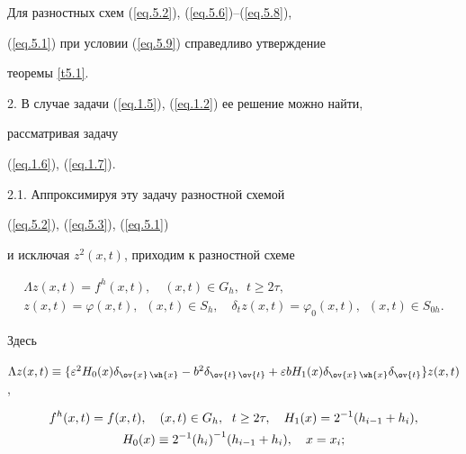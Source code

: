 Для разностных схем (\ref{eq.5.2}), (\ref{eq.5.6})--(\ref{eq.5.8}),


(\ref{eq.5.1}) при условии (\ref{eq.5.9}) справедливо утверждение


теоремы \ref{t5.1}.





2. В случае задачи (\ref{eq.1.5}), (\ref{eq.1.2}) ее решение можно найти,


рассматривая задачу


(\ref{eq.1.6}), (\ref{eq.1.7}).





2.1. Аппроксимируя эту задачу разностной схемой


(\ref{eq.5.2}), (\ref{eq.5.3}), (\ref{eq.5.1})


и исключая $z^2(x, t)$, приходим к разностной схеме


\begin{equation}


\label{eq.5.10}


\begin{array}{c}


\Lambda z(x, t)=f^h(x, t), \quad (x, t)\in G_h, \ \; t\ge 2\tau,\\


z(x, t)=\varphi(x, t), \ \; (x, t)\in S_h,\quad


\delta_t z(x, t)=\varphi_0(x, t), \ \; (x, t)\in S_{0h}.


\end{array}


\end{equation}


Здесь


$\Lambda z(x,t)\equiv \{\varepsilon^2 H_0(x) \delta_{\ov{x}\,\wh{x}}-b^2


\delta_{\ov{t}\,\ov{t}}+\varepsilon b H_1(x) \delta_{\ov{x}\,\wh{x}}


\delta_{\ov{t}}\}z(x,t)$,


\begin{gather}


f^h(x, t)=f(x, t), \quad (x, t)\in G_h, \ \; t\ge 2\tau,\quad


H_1(x)=2^{-1}(h_{i-1}+h_i), \notag \\


\label{eq.5.11}


H_0(x)\equiv 2^{-1}{(h_i)}^{-1} (h_{i-1}+h_i), \quad x=x_i;


\end{gather}


